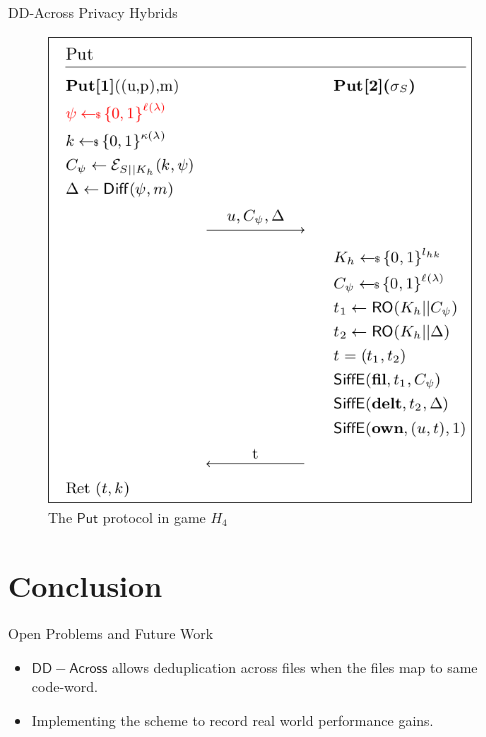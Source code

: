 \documentclass{beamer}
\newcommand{\scheme}{\mathsf{DD-Across}}
\begin{document}
\begin{frame}{DD-Across Privacy Hybrids}
    \begin{figure}[H]
      \centering
      \includegraphics[scale=0.3]{H4}
      \caption{The $\mathsf{Put}$ protocol in game $H_4$}
    \end{figure}
\end{frame}

%    
\section{Conclusion}
\begin{frame}{Open Problems and Future Work}
	\begin{itemize}
		\setlength\itemsep{1em}
		\item $\scheme$ allows deduplication across files when the files map to same code-word.
		\item Implementing the scheme to record real world performance gains.
	\end{itemize}
\end{frame}
\end{document}

